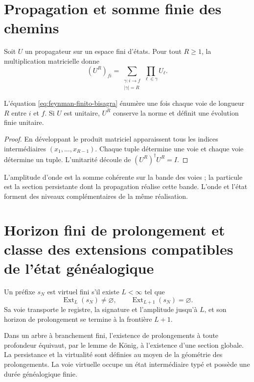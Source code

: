 \section{Propagation et somme finie des chemins}

Soit \(U\) un propagateur sur un espace fini d'états. Pour tout
\(R\geq1\), la multiplication matricielle donne
\begin{equation}
 (U^R)_{fi}
 =\sum_{\substack{\gamma:i\to f\\|\gamma|=R}}
   \prod_{\ell\in\gamma}U_\ell.
 \label{eq:feynman-finito-bisagra}
\end{equation}

\begin{theorem}
\label{thm:feynman-finito-bisagra}
L'équation \eqref{eq:feynman-finito-bisagra} énumère une fois chaque voie de
longueur \(R\) entre \(i\) et \(f\). Si \(U\) est unitaire, \(U^R\) conserve
la norme et définit une évolution finie unitaire.
\end{theorem}

\begin{proof}
En développant le produit matriciel apparaissent tous les indices intermédiaires
\((x_1,\ldots,x_{R-1})\). Chaque tuple détermine une voie et chaque voie détermine
un tuple. L'unitarité découle de
\((U^R)^\dagger U^R=I\).
\end{proof}

L'amplitude d'onde est la somme cohérente sur la bande des voies ; la
particule est la section persistante dont la propagation réalise cette bande. L'onde
et l'état forment des niveaux complémentaires de la même réalisation.

\section{Horizon fini de prolongement et classe des extensions compatibles de l'état généalogique}

\begin{definition}
\label{def:ruta-virtual-finita-bisagra}
Un préfixe \(s_N\) est virtuel fini s'il existe \(L<\infty\) tel que
\[
 \operatorname{Ext}_L(s_N)\neq\varnothing,
 \qquad
 \operatorname{Ext}_{L+1}(s_N)=\varnothing.
\]
Sa voie transporte le registre, la signature et l'amplitude jusqu'à \(L\), et son horizon de
prolongement se termine à la frontière \(L+1\).
\end{definition}

Dans un arbre à branchement fini, l'existence de prolongements à toute
profondeur équivaut, par le lemme de König, à l'existence d'une section
globale. La persistance et la virtualité sont définies au moyen de la
géométrie des prolongements. La voie virtuelle occupe un état intermédiaire
typé et possède une durée généalogique finie.

